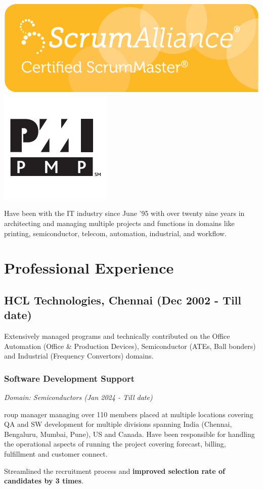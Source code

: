 \documentclass[a4paper,11pt]{article}
\newcommand\cvsubsection[3]{\subsection*{#1 \quad \small{(#2 - #3)}}}
\newcommand\cvprojectentry[5]{
  \subsubsection*{#1}
  
  \vspace{-7pt}
  
  \it{Domain: #2}\normalfont{} \quad (#3 - #4)
  
}
\begin{document}
\includegraphics[height=1.5\baselineskip]{agile}
\includegraphics[height=1.5\baselineskip]{pmp}

Have been with the IT industry since June '95 with over twenty nine years
in architecting and managing multiple projects and functions in
domains like printing, semiconductor, telecom, automation, industrial,
and workflow.

\section*{Professional Experience}
  
\cvsubsection{HCL Technologies, Chennai}{Dec 2002}{Till date}

Extensively managed programs and technically contributed on the Office
Automation (Office \& Production Devices), Semiconductor (ATEs, Ball
bonders) and Industrial (Frequency Convertors) domains.

\cvprojectentry{Software Development Support}{Semiconductors}{Jan 2024}{Till date}

Group manager managing over 110 members placed at multiple locations
covering QA and SW development for multiple divisions spanning India
(Chennai, Bengaluru, Mumbai, Pune), US and Canada. Have been
responsible for handling the operational aspects of running the
project covering forecast, billing, fulfillment and customer connect.

Streamlined the recruitment process and \textbf{improved selection rate of
candidates by 3 times}.
\end{document}
